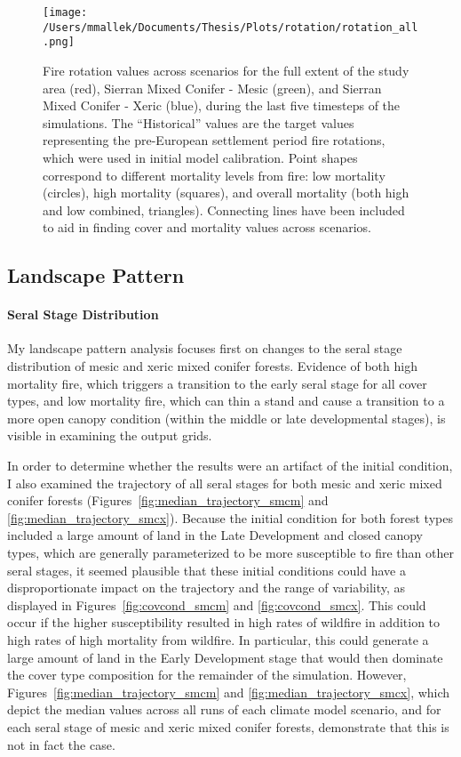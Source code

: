 \begin{figure}
\centering
\texttt{[image: /Users/mmallek/Documents/Thesis/Plots/rotation/rotation\_all.png]}
\caption{Fire rotation values across scenarios for the full extent of the study area (red), Sierran Mixed Conifer - Mesic (green), and Sierran Mixed Conifer - Xeric (blue), during the last five timesteps of the simulations. The ``Historical'' values are the target values representing the pre-European settlement period fire rotations, which were used in initial model calibration. Point shapes correspond to different mortality levels from fire: low mortality (circles), high mortality (squares), and overall mortality (both high and low combined, triangles). Connecting lines have been included to aid in finding cover and mortality values across scenarios.}
\label{fig:frotation}
\end{figure}



\subsection*{Landscape Pattern}

\paragraph*{Seral Stage Distribution}
My landscape pattern analysis focuses first on changes to the seral stage distribution of mesic and xeric mixed conifer forests. Evidence of both high mortality fire, which triggers a transition to the early seral stage for all cover types, and low mortality fire, which can thin a stand and cause a transition to a more open canopy condition (within the middle or late developmental stages), is visible in examining the output grids.

In order to determine whether the results were an artifact of the initial condition, I also examined the trajectory of all seral stages for both mesic and xeric mixed conifer forests (Figures~\ref{fig:median_trajectory_smcm} and \ref{fig:median_trajectory_smcx}). Because the initial condition for both forest types included a large amount of land in the Late Development and closed canopy types, which are generally parameterized to be more susceptible to fire than other seral stages, it seemed plausible that these initial conditions could have a disproportionate impact on the trajectory and the range of variability, as displayed in Figures~\ref{fig:covcond_smcm} and \ref{fig:covcond_smcx}. This could occur if the higher susceptibility resulted in high rates of wildfire in addition to high rates of high mortality from wildfire. In particular, this could generate a large amount of land in the Early Development stage that would then dominate the cover type composition for the remainder of the simulation. However, Figures~\ref{fig:median_trajectory_smcm} and \ref{fig:median_trajectory_smcx}, which depict the median values across all runs of each climate model scenario, and for each seral stage of mesic and xeric mixed conifer forests, demonstrate that this is not in fact the case. 


